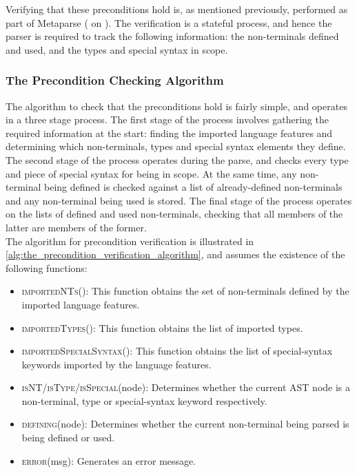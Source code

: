 Verifying that these preconditions hold is, as mentioned previously, performed as part of Metaparse ( on ).
The verification is a stateful process, and hence the parser is required to track the following information: the non-terminals defined and used, and the types and special syntax in scope. 

\subsubsection{The Precondition Checking Algorithm} %
\label{ssub:the_precondition_checking_algorithm}
The algorithm to check that the preconditions hold is fairly simple, and operates in a three stage process.
The first stage of the process involves gathering the required information at the start: finding the imported language features and determining which non-terminals, types and special syntax elements they define.
The second stage of the process operates during the parse, and checks every type and piece of special syntax for being in scope. 
At the same time, any non-terminal being defined is checked against a list of already-defined non-terminals and any non-terminal being used is stored.
The final stage of the process operates on the lists of defined and used non-terminals, checking that all members of the latter are members of the former.\\

The algorithm for precondition verification is illustrated in \autoref{alg:the_precondition_verification_algorithm}, and assumes the existence of the following functions:
\begin{itemize}
    \item \textsc{importedNTs}(): This function obtains the set of non-terminals defined by the imported language features.
    \item \textsc{importedTypes}(): This function obtains the list of imported types.
    \item \textsc{importedSpecialSyntax}(): This function obtains the list of special-syntax keywords imported by the language features. 
    \item \textsc{isNT/isType/isSpecial}(node): Determines whether the current AST node is a non-terminal, type or special-syntax keyword respectively.
    \item \textsc{defining}(node): Determines whether the current non-terminal being parsed is being defined or used. 
    \item \textsc{error}(msg): Generates an error message.
\end{itemize}

